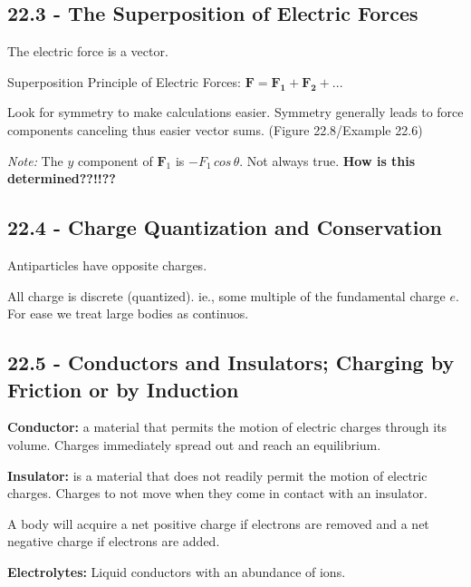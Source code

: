 \documentclass[twocolumn]{article}
\newenvironment{small_item}{
\begin{itemize}
  \setlength{\itemsep}{.25pt}
  \setlength{\parskip}{0pt}
  \setlength{\parsep}{0pt}
}{\end{itemize}}
\begin{document}
	\subsection*{22.3 - The Superposition of Electric Forces} %
	\label{sub:22_3_the_superposition_of_electric_forces}
	
	\begin{small_item}
		\item The electric force is a vector.
		\item Superposition Principle of Electric Forces: $\mathbf{F = F_{1} + F_{2} + ...}$
		\item Look for symmetry to make calculations easier.  Symmetry generally leads to force components canceling thus easier vector sums. (Figure 22.8/Example 22.6)
		\item \emph{Note:} The $y$ component of $\mathbf{F}_1$ is $-F_1\,cos\,\theta$.  Not always true.  \textbf{How is this determined??!!??}
	\end{small_item}
	
	\subsection*{22.4 - Charge Quantization and Conservation} %
	\label{sub:22_4_charge_quantization_and_conservation}
	
	\begin{small_item}
		\item Antiparticles have opposite charges.
		\item All charge is discrete (quantized).  ie., some multiple of the fundamental charge $e$.  For ease we treat large bodies as continuos.
	\end{small_item}
	
	\subsection*{22.5 - Conductors and Insulators; Charging by Friction or by Induction} %
	\label{sub:22_5_conductors_and_insulators_charging_by_friction_or_by_induction}
	
	\begin{small_item}
		\item \textbf{Conductor:} a material that permits the motion of electric charges through its volume.  Charges immediately spread out and reach an equilibrium. 
		\item \textbf{Insulator:} is a material that does not readily permit the motion of electric charges.  Charges to not move when they come in contact with an insulator.
		\item A body will acquire a net positive charge if electrons are removed and a net negative charge if electrons are added.
		\item \textbf{Electrolytes:} Liquid conductors with an abundance of ions.
	\end{small_item}
	
\end{document}
